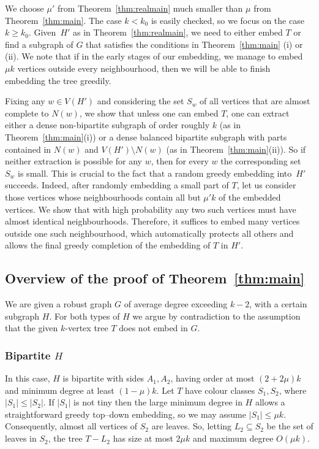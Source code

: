\documentclass[12pt]{article}
\begin{document}
We choose $\mu'$ from Theorem~\ref{thm:realmain} much smaller than $\mu$ from Theorem~\ref{thm:main}. The case $k<k_0$ is easily checked, so we focus on the case $k\ge k_0$. Given~$H'$ as in Theorem~\ref{thm:realmain}, we need to either embed $T$ or find a subgraph of $G$ that satisfies the conditions in Theorem~\ref{thm:main} (i) or (ii). We note that if in the early stages of our embedding, we manage to 
embed $\mu k$  vertices outside every neighbourhood, then we will be able to  finish embedding the tree greedily. 

Fixing any $w\in V(H')$ and considering the set $S_w$ of all vertices that are almost complete  to $N(w)$, we show that unless one can embed $T$, 
one can extract either a dense non-bipartite subgraph of order roughly  $k$ (as in Theorem~\ref{thm:main}(i)) or a dense balanced bipartite subgraph
with parts contained in $N(w)$ and $V(H')\setminus N(w)$ (as in Theorem~\ref{thm:main}(ii)).
So if neither extraction is possible for any $w$, then for every $w$ the corresponding set $S_w$ is small. This is crucial to the fact that a random greedy embedding into~$H'$ succeeds. Indeed, 
after randomly embedding a small part of $T$, let us consider those   vertices whose neighbourhoods contain all but $\mu ' k$ of the embedded vertices.  We  show that  with high probability any two such vertices must have almost identical neighbourhoods. Therefore,  it suffices to embed many vertices outside one such neighbourhood,
which automatically protects all others and allows the final greedy completion of the embedding of $T$ in $H'$.



\subsection{Overview of the proof of Theorem~\ref{thm:main}}
We are given a robust graph $G$ of average degree exceeding $k-2$, with a certain subgraph $H$. 
For both types of $H$ we argue by contradiction to the assumption that the given $k$-vertex tree $T$ does not embed in  $G$.

\subsubsection{Bipartite $H$}

In this case,   $H$ is bipartite with sides $A_1,A_2$, having order at most $(2+2\mu)k$ and
minimum degree at least $(1-\mu)k$.
Let $T$ have colour classes $S_1,S_2$, where $|S_1|\le |S_2|$.
If $|S_1|$ is not tiny then the large minimum degree in $H$ allows a straightforward greedy
top--down embedding, so we may assume $|S_1|\le \mu k$.
Consequently, almost all vertices of $S_2$ are leaves. So, letting $L_2\subseteq S_2$ be the set of leaves in $S_2$,
the tree $T-L_2$ has size at most $2\mu k$ and maximum degree $O(\mu k)$.
\end{document}
